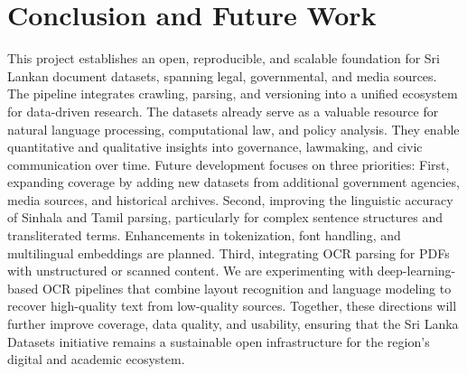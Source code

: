 \documentclass[10pt,a4paper]{article}%
\begin{document}
\section{Conclusion and Future Work}%
\label{sec:ConclusionandFutureWork}%
This project establishes an open, reproducible, and scalable foundation for Sri Lankan document datasets, spanning legal, governmental, and media sources. The pipeline integrates crawling, parsing, and versioning into a unified ecosystem for data-driven research.%
\citep{OpenDataPractices2020}%
\newline%
\newline%
The datasets already serve as a valuable resource for natural language processing, computational law, and policy analysis. They enable quantitative and qualitative insights into governance, lawmaking, and civic communication over time.%
\citep{FAIRPrinciples2016}%
\newline%
\newline%
Future development focuses on three priorities:%
\newline%
\newline%
First, expanding coverage by adding new datasets from additional government agencies, media sources, and historical archives.%
\citep{DataExpansion2023}%
\newline%
\newline%
Second, improving the linguistic accuracy of Sinhala and Tamil parsing, particularly for complex sentence structures and transliterated terms. Enhancements in tokenization, font handling, and multilingual embeddings are planned.%
\citep{MultilingualNLP2022}%
\newline%
\newline%
Third, integrating OCR parsing for PDFs with unstructured or scanned content. We are experimenting with deep-learning-based OCR pipelines that combine layout recognition and language modeling to recover high-quality text from low-quality sources.%
\citep{OCROpenResearch2021}%
\newline%
\newline%
Together, these directions will further improve coverage, data quality, and usability, ensuring that the Sri Lanka Datasets initiative remains a sustainable open infrastructure for the region’s digital and academic ecosystem.%
\citep{OpenDataSustainability2020}%
\newline%
\newline

%
%
%
\end{document}
